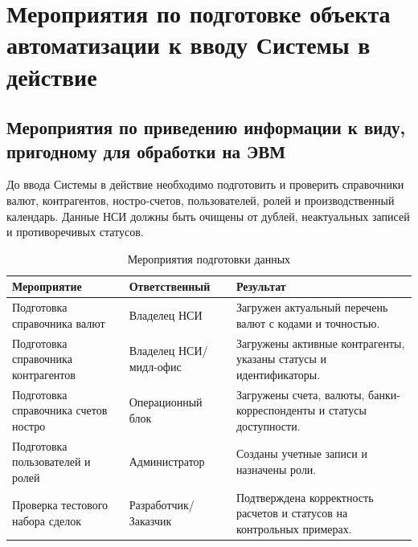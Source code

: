 \documentclass[a4paper,14pt]{extarticle}
\begin{document}
\section{Мероприятия по подготовке объекта автоматизации к вводу Системы в действие}

\subsection{Мероприятия по приведению информации к виду, пригодному для обработки на ЭВМ}
До ввода Системы в действие необходимо подготовить и проверить справочники валют, контрагентов, ностро-счетов, пользователей, ролей и производственный календарь. Данные НСИ должны быть очищены от дублей, неактуальных записей и противоречивых статусов.

\begin{table}[H]
\centering
\small
\caption{Мероприятия подготовки данных}
\label{tab:data-prep}
\begin{tabularx}{\linewidth}{|L{45mm}|L{45mm}|X|}
\hline
\textbf{Мероприятие} & \textbf{Ответственный} & \textbf{Результат} \\
\hline
Подготовка справочника валют & Владелец НСИ & Загружен актуальный перечень валют с кодами и точностью. \\
\hline
Подготовка справочника контрагентов & Владелец НСИ/мидл-офис & Загружены активные контрагенты, указаны статусы и идентификаторы. \\
\hline
Подготовка справочника счетов ностро & Операционный блок & Загружены счета, валюты, банки-корреспонденты и статусы доступности. \\
\hline
Подготовка пользователей и ролей & Администратор & Созданы учетные записи и назначены роли. \\
\hline
Проверка тестового набора сделок & Разработчик/Заказчик & Подтверждена корректность расчетов и статусов на контрольных примерах. \\
\hline
\end{tabularx}
\end{table}
\end{document}
